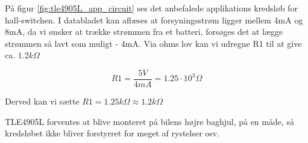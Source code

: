 På figur \ref{fig:tle4905L_app_circuit} ses det anbefalede applikations kredsløb for hall-switchen. I databladet kan aflæses at forsyningsstrøm ligger mellem 4mA og 8mA, da vi ønsker at trække strømmen fra et batteri, forsøges det at lægge strømmen så lavt som muligt - 4mA. Via ohms lov kan vi udregne R1 til at give ca. $1.2k\Omega$

\begin{equation}
R1 = \dfrac{5V}{4mA} = 1.25\cdot 10^3 \Omega
\end{equation}

Derved kan vi sætte $R1 = 1.25k\Omega \approx 1.2k\Omega$

TLE4905L forventes at blive monteret på bilens højre baghjul, på en måde, så kredsløbet ikke bliver forstyrret for meget af rystelser osv. 